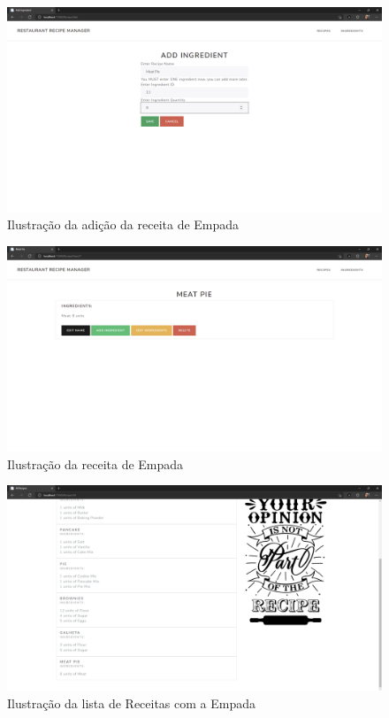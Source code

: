 \FloatBarrier
\begin{figure}[!hbt]
    \centering
    \includegraphics[width=14cm]{Resources/WebApp/Recipes/recipe (13).png}
    \caption{Ilustração da adição da receita de Empada}
    \label{fig:app_rec_13}
\end{figure}
\FloatBarrier
\begin{figure}[!hbt]
    \centering
    \includegraphics[width=14cm]{Resources/WebApp/Recipes/recipe (14).png}
    \caption{Ilustração da receita de Empada}
    \label{fig:app_rec_14}
\end{figure}
\FloatBarrier
\begin{figure}[!hbt]
    \centering
    \includegraphics[width=14cm]{Resources/WebApp/Recipes/recipe (15).png}
    \caption{Ilustração da lista de Receitas com a Empada}
    \label{fig:app_rec_15}
\end{figure}
